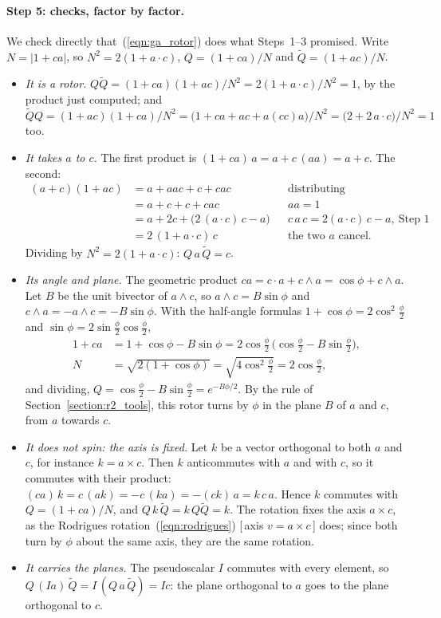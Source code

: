 \paragraph{Step 5: checks, factor by factor.} We check directly that~(\ref{eqn:ga_rotor}) does what Steps~1--3 promised. Write $N = |1 + ca|$, so $N^2 = 2(1 + a\cdot c)$, $Q = (1 + ca)/N$ and $\widetilde Q = (1 + ac)/N$.
\begin{itemize}
\item \emph{It is a rotor.} $Q\widetilde Q = (1 + ca)(1 + ac)/N^2 = 2(1 + a\cdot c)/N^2 = 1$, by the product just computed; and $\widetilde Q Q = (1 + ac)(1 + ca)/N^2 = \big(1 + ca + ac + a(cc)a\big)/N^2 = \big(2 + 2\,a\cdot c\big)/N^2 = 1$ too.
\item \emph{It takes $a$ to $c$.} The first product is $(1 + ca)\,a = a + c\,(aa) = a + c$. The second:
\begin{align*}
(a + c)(1 + a c) &= a + a a c + c + c a c && \text{distributing} \\
&= a + c + c + c a c && a a = 1 \\
&= a + 2c + \big(2\,(a\cdot c)\, c - a\big) && c\,a\,c = 2(a\cdot c)\,c - a,\ \text{Step 1} \\
&= 2\,(1 + a\cdot c)\, c && \text{the two } a \text{ cancel.}
\end{align*}
Dividing by $N^2 = 2(1 + a\cdot c)$: $Q\,a\,\widetilde Q = c$.
\item \emph{Its angle and plane.} The geometric product $ca = c\cdot a + c\wedge a = \cos\phi + c\wedge a$. Let $B$ be the unit bivector of $a\wedge c$, so $a\wedge c = B\sin\phi$ and $c\wedge a = -a\wedge c = -B\sin\phi$. With the half-angle formulas $1 + \cos\phi = 2\cos^2\frac\phi2$ and $\sin\phi = 2\sin\frac\phi2\cos\frac\phi2$,
\begin{align*}
1 + c a &= 1 + \cos\phi - B\sin\phi = 2\cos\tfrac\phi2\,\big(\cos\tfrac\phi2 - B\sin\tfrac\phi2\big), \\
N &= \sqrt{2(1 + \cos\phi)} = \sqrt{4\cos^2\tfrac\phi2} = 2\cos\tfrac\phi2 ,
\end{align*}
and dividing, $Q = \cos\frac\phi2 - B\sin\frac\phi2 = e^{-B\phi/2}$. By the rule of Section~\ref{section:r2_tools}, this rotor turns by $\phi$ in the plane $B$ of $a$ and $c$, from $a$ towards $c$.
\item \emph{It does not spin: the axis is fixed.} Let $k$ be a vector orthogonal to both $a$ and $c$, for instance $k = a\times c$. Then $k$ anticommutes with $a$ and with $c$, so it commutes with their product: $(ca)\,k = c\,(a k) = -c\,(k a) = -(c k)\, a = k\, c\, a$. Hence $k$ commutes with $Q = (1 + ca)/N$, and $Q\,k\,\widetilde Q = k\,Q\widetilde Q = k$. The rotation fixes the axis $a\times c$, as the Rodrigues rotation~(\ref{eqn:rodrigues}) [\,axis $v = a\times c$\,] does; since both turn by $\phi$ about the same axis, they are the same rotation.
\item \emph{It carries the planes.} The pseudoscalar $I$ commutes with every element, so $Q\,(Ia)\,\widetilde Q = I\,(Q\,a\,\widetilde Q) = I c$: the plane orthogonal to $a$ goes to the plane orthogonal to $c$.
\end{itemize}

